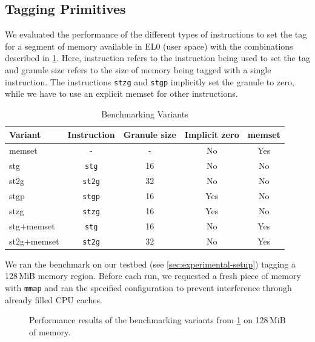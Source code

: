 \subsection{Tagging Primitives}
\label{subsec:tagging-primitives}

We evaluated the performance of the different types of instructions to set the tag for a segment of memory available in EL0 (user space) with the combinations described in \cref{tab:stg-instructions}.
Here, instruction refers to the instruction being used to set the tag and granule size refers to the size of memory being tagged with a single instruction.
The instructions \texttt{stzg} and \texttt{stgp} implicitly set the granule to zero, while we have to use an explicit memset for other instructions.

\begin{table}[h]
    \centering
    \small
    \begin{tabular}{| l || c | c |  c | c |}
        \hline
        \textbf{Variant} & \textbf{Instruction} & \textbf{Granule size} & \textbf{Implicit zero} & \textbf{memset} \\
        \hline
        memset      & -             & -  & No  & Yes \\
        stg         & \texttt{stg}  & 16 & No  & No  \\
        st2g        & \texttt{st2g} & 32 & No  & No  \\
        stgp        & \texttt{stgp} & 16 & Yes & No  \\
        stzg        & \texttt{stzg} & 16 & Yes & No  \\
        stg+memset  & \texttt{stg}  & 16 & No  & Yes \\
        st2g+memset & \texttt{st2g} & 32 & No  & Yes \\
        \hline
    \end{tabular}
    \caption{Benchmarking Variants}
    \label{tab:stg-instructions}
\end{table}

We ran the benchmark on our testbed (see \cref{sec:experimental-setup}) tagging a 128\,MiB memory region.
Before each run, we requested a fresh piece of memory with \texttt{mmap} and ran the specified configuration to prevent interference through already filled CPU caches.

\begin{figure}[h]
    \centering
    
    \caption{Performance results of the benchmarking variants from \cref{tab:stg-instructions} on 128\,MiB of memory.}
    \label{fig:stg-performance}
\end{figure}

